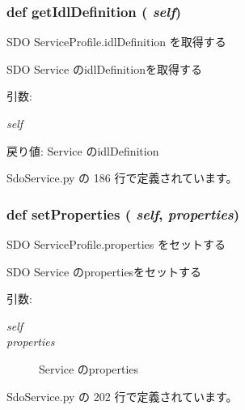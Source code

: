 \subsubsection{\setlength{\rightskip}{0pt plus 5cm}def getIdlDefinition ( {\em self})}\label{classsource__py_1_1_sdo_service_1_1_s_d_o_service_profile_97be8fe9b7e6a89ad11a9beccf3cf9e2}


SDO ServiceProfile.idlDefinition を取得する 

SDO Service のidlDefinitionを取得する

\begin{Desc}
\item[引数:]
\begin{description}
\item[{\em self}]\end{description}
\end{Desc}
\begin{Desc}
\item[戻り値:]Service のidlDefinition \end{Desc}


 SdoService.py の 186 行で定義されています。
\subsubsection{\setlength{\rightskip}{0pt plus 5cm}def setProperties ( {\em self},  {\em properties})}\label{classsource__py_1_1_sdo_service_1_1_s_d_o_service_profile_fed99117a9da3a3d247cf9c5dd556386}


SDO ServiceProfile.properties をセットする 

SDO Service のpropertiesをセットする

\begin{Desc}
\item[引数:]
\begin{description}
\item[{\em self}]\item[{\em properties}]Service のproperties \end{description}
\end{Desc}


 SdoService.py の 202 行で定義されています。
